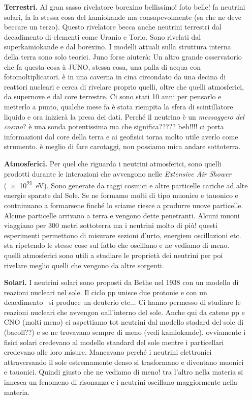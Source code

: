             \begin{enumerate}
                \item[\textbf{Terrestri.}] Al gran sasso rivelatore borexino bellissimo! foto belle! fa neutrini solari, fa la stessa cosa del kamiokande ma consapevolmente (sa che ne deve beccare un terzo). Questo rivelatore becca anche neutrini terrestri dal decadimento di elementi come Uranio e Torio. Sono rivelati dal superkamiokande e dal borexino. I modelli attuali sulla struttura interna della terra sono solo teorici. Juno forse aiuterà: Un altro grande osservatorio che fa questa cosa à JUNO, stessa cosa, una palla di acqua con fotomoltiplicatori. è in una caverna in cina circondato da una decina di reattori nucleari e cerca di rivelare proprio quelli, oltre che quelli atmosferici, da supernove e dal core terrestre. Ci sono stati 10 anni per pensarlo e metterlo a punto, qualche mese fa è stata riempita la sfera di scintillatore liquido e ora inizierà la presa dei dati. Perché il neutrino è un \emph{messaggero del cosmo}? è una sonda potentissima ma che significa????? beh!!!! ci porta informazioni dal core della terra e ai geofisici torna molto utile averlo come strumento. è meglio di fare carotaggi, non possiamo mica andare sottoterra.  
                
                \item[\textbf{Atmosferici.}] Per quel che riguarda i neutrini atmosferici, sono quelli prodotti durante le interazioni che avvengono nelle \textit{Extensive Air Shower} (\SI{e+21}{\eV}). Sono generate da raggi cosmici e altre particelle cariche ad alte energie sparate dal Sole. Se ne formamo molti di tipo muonico e tauonico e contninuano a formarsene finché lo sciame riesce a produrre nuove particelle. Alcune particelle arrivano a terra e vengono dette penetranti. Alcuni muoni viaggiano per 300 metri sottoterra ma i neutrini molto di più! questi esperimenti permettono di misurare sezioni d'urto, energiem oscillazioni etc. sta ripetendo le stesse cose sul fatto che oscillano e ne vediamo di meno. quelli atmosferici sono utili a studiare le proprietà dei neutrini per poi rivelare meglio quelli che vengono da altre sorgenti.
                
                \item[\textbf{Solari.}] I neutrini solari sono proposti da Bethe nel 1938 con un modello di reazioni nucleari nel sole. Il ciclo pp unisce due protonie e con un deacdimento \betap\ si produce un deuterio etc... Ci hanno permesso di studiare le reazioni nucleari che avvengon oall'interno del sole. Anche qui da catene pp e CNO (molti meno) ci aspettiamo tot neutrini dal modello stadard del sole di (bacoll??) e se ne trovavano sempre di meno (vedi kamiokande). ovviamente i fisici solari credevano al modello standard del sole mentre i particellari credevano alle loro misure. Mancavano perché i neutrini elettronici attraversando il sole estremamente denso si trasformano e diventano muonici e tauonici. Quindi giusto che ne vediamo di meno! tra l'altro nella materia si innesca un fenomeno di risonanza e i neutrini oscillano maggiormente nella materia.
            

\end{enumerate}

